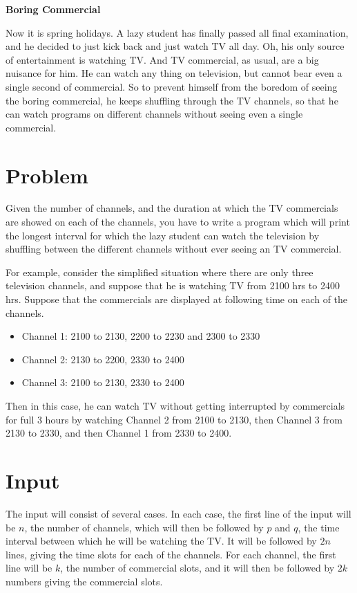 \documentclass[10pt]{article}
\begin{document}
\begin{center}
{\huge {\bf Boring Commercial}}
\end{center}

Now it is spring holidays. A lazy student has finally passed all final examination, and he decided to just kick back and just watch TV all day. Oh, his only source of entertainment is watching TV. And TV commercial, as usual, are a big nuisance for him. He can watch any thing on television, but cannot bear even a single second of commercial. So to prevent himself from the boredom of seeing the boring commercial, he keeps shuffling through the TV channels, so that he can watch programs on different channels without seeing even a single commercial.

\section*{Problem}

Given the number of channels, and the duration at which the TV commercials are showed on each of the channels, you have to write a program which will print the longest interval for which the lazy student can watch the television by shuffling between the different channels without ever seeing an TV commercial.


For example, consider the simplified situation where there are only three television channels, and suppose that he is watching TV from 2100 hrs to 2400 hrs. Suppose that the commercials are displayed at following time on each of the channels.

\begin{itemize}
\item{Channel 1: 2100 to 2130, 2200 to 2230 and 2300 to 2330}
\item{Channel 2: 2130 to 2200, 2330 to 2400}
\item{Channel 3: 2100 to 2130, 2330 to 2400}
\end{itemize}

Then in this case, he can watch TV without getting interrupted by commercials for full 3 hours by watching Channel 2 from 2100 to 2130, then Channel 3 from 2130 to 2330, and then Channel 1 from 2330 to 2400.

\section*{Input}
The input will consist of several cases. In each case, the first line of the input will be $n$, the number of channels, which will then be followed by $p$ and $q$, the time interval between which he will be watching the TV. It will be followed by $2n$ lines, giving the time slots for each of the channels. For each channel, the first line will be $k$, the number of commercial slots, and it will then be followed by $2k$ numbers giving the commercial slots.
\end{document}

